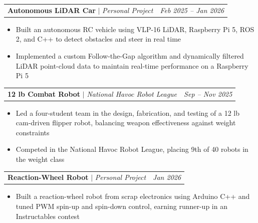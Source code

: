 \documentclass[letterpaper,11pt]{article}
\makeatletter
\newcommand{\resumeItem}[1]{
  \item\small{
    {#1 \vspace{-2pt}}
  }
}
\newcommand{\resumeProjectHeading}[2]{
    \item
    \begin{tabular*}{0.97\textwidth}[t]{l@{\extracolsep{\fill}}r}
      \small#1 & \textit{\small #2} \\
    \end{tabular*}\vspace{-7pt}
}
\newcommand{\resumeItemListStart}{\begin{itemize}}
\newcommand{\resumeItemListEnd}{\end{itemize}\vspace{-5pt}}
\makeatother
\begin{document}

    \resumeProjectHeading
      {\textbf{Autonomous LiDAR Car} $|$ \emph{Personal Project}}{Feb 2025 -- Jan 2026}
      \resumeItemListStart
        \resumeItem{Built an autonomous RC vehicle using VLP-16 LiDAR, Raspberry Pi 5, ROS 2, and C++ to detect obstacles and steer in real time}
        \resumeItem{Implemented a custom Follow-the-Gap algorithm and dynamically filtered LiDAR point-cloud data to maintain real-time performance on a Raspberry Pi 5}
      \resumeItemListEnd

    \resumeProjectHeading
      {\textbf{12 lb Combat Robot} $|$ \emph{National Havoc Robot League}}{Sep -- Nov 2025}
      \resumeItemListStart
        \resumeItem{Led a four-student team in the design, fabrication, and testing of a 12 lb cam-driven flipper robot, balancing weapon effectiveness against weight constraints}
        \resumeItem{Competed in the National Havoc Robot League, placing 9th of 40 robots in the weight class}
      \resumeItemListEnd

    

    
    \resumeProjectHeading
      {\textbf{Reaction-Wheel Robot} $|$ \emph{Personal Project}}{Jan 2026}
      \resumeItemListStart
        \resumeItem{Built a reaction-wheel robot from scrap electronics using Arduino C++ and tuned PWM spin-up and spin-down control, earning runner-up in an Instructables contest}
      \resumeItemListEnd
      
\end{document}
